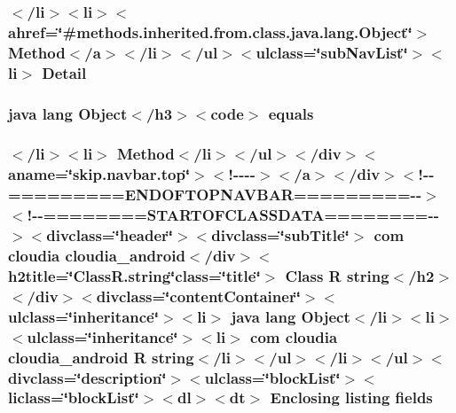 \hypertarget{_r_8string_8html_aed0df2ae11502bf9389ac3cf53b1c0f6}{
\subsubsection[{Detail}]{\setlength{\rightskip}{0pt plus 5cm}$<$/li$>$$<$li$>$$<$ahref=\char`\"{}\#methods.\-inherited.\-from.\-class.\-java.\-lang.\-Object\char`\"{}$>$ Method$<$/{\bf a}$>$$<$/li$>$$<$/ul$>$$<$ulclass=\char`\"{}sub\-Nav\-List\char`\"{}$>$$<$li$>$ Detail}}\label{_r_8string_8html_aed0df2ae11502bf9389ac3cf53b1c0f6}
\hypertarget{_r_8string_8html_a8974318cea585f72df717e0380ec7104}{
\subsubsection[{equals}]{\setlength{\rightskip}{0pt plus 5cm}java lang Object$<$/h3$>$$<$code$>$ equals}}\label{_r_8string_8html_a8974318cea585f72df717e0380ec7104}
\hypertarget{_r_8string_8html_a658c8dee06a6ee3fb2640269261ee4ad}{
\subsubsection[{fields}]{\setlength{\rightskip}{0pt plus 5cm}$<$/li$>$$<$li$>$ Method$<$/li$>$$<$/ul$>$$<$/div$>$$<$aname=\char`\"{}skip.\-navbar.\-top\char`\"{}$>$$<$!-\/-\/-\/-\/$>$$<$/a$>$$<$/div$>$$<$!-\/-\/=========E\-N\-D\-O\-F\-T\-O\-P\-N\-A\-V\-B\-A\-R=========-\/-\/$>$$<$!-\/-\/========S\-T\-A\-R\-T\-O\-F\-C\-L\-A\-S\-S\-D\-A\-T\-A========-\/-\/$>$$<$divclass=\char`\"{}header\char`\"{}$>$$<$divclass=\char`\"{}sub\-Title\char`\"{}$>$ com cloudia cloudia\-\_\-android$<$/div$>$$<$h2title=\char`\"{}Class\-R.\-string\char`\"{}class=\char`\"{}title\char`\"{}$>$ Class {\bf R} {\bf string}$<$/h2$>$$<$/div$>$$<$divclass=\char`\"{}content\-Container\char`\"{}$>$$<$ulclass=\char`\"{}inheritance\char`\"{}$>$$<$li$>$ java lang Object$<$/li$>$$<$li$>$$<$ulclass=\char`\"{}inheritance\char`\"{}$>$$<$li$>$ com cloudia cloudia\-\_\-android {\bf R} {\bf string}$<$/li$>$$<$/ul$>$$<$/li$>$$<$/ul$>$$<$divclass=\char`\"{}description\char`\"{}$>$$<$ulclass=\char`\"{}block\-List\char`\"{}$>$$<$liclass=\char`\"{}block\-List\char`\"{}$>$$<$dl$>$$<${\bf dt}$>$ Enclosing listing fields}}\label{_r_8string_8html_a658c8dee06a6ee3fb2640269261ee4ad}
